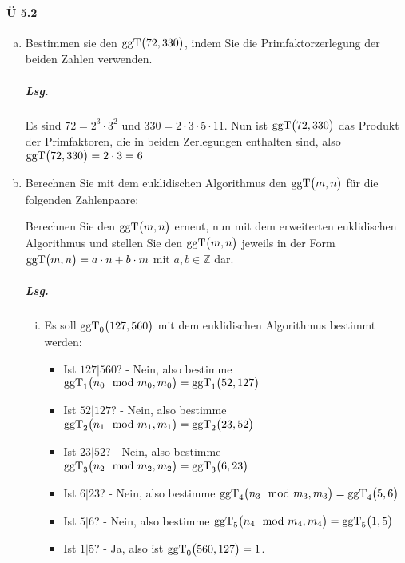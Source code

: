 \documentclass{scrreprt}
\newcommand{\ggT}[0]{\text{ggT}}
\begin{document}
\paragraph{Ü 5.2}
\begin{enumerate}[(a)]
\item Bestimmen sie den $\ggT\qty\big(72, 330)$, indem Sie die
  Primfaktorzerlegung der beiden Zahlen verwenden.

  \subparagraph{Lsg.} Es sind $72 = 2^3 \cdot 3^2$ und
  $330 = 2 \cdot 3 \cdot 5 \cdot 11$.
  Nun ist $\ggT\qty\big(72, 330)$ das Produkt der Primfaktoren, die in beiden
  Zerlegungen enthalten sind, also $\ggT\qty\big(72, 330) = 2 \cdot 3 = 6$

\newpage
\item Berechnen Sie mit dem euklidischen Algorithmus den $\ggT\qty\big(m, n)$
  für die folgenden Zahlenpaare:


  Berechnen Sie den $\ggT\qty\big(m, n)$ erneut, nun mit dem erweiterten
  euklidischen Algorithmus und stellen Sie den $\ggT\qty\big(m, n)$ jeweils
  in der Form $\ggT\qty\big(m, n) = a \cdot n + b \cdot m$ mit
  $a, b \in \mathbb{Z}$ dar.

  \subparagraph{Lsg.}
  \begin{enumerate}[(i)]
  \item Es soll $\ggT_0\qty\big(127, 560)$ mit dem euklidischen Algorithmus
    bestimmt werden:
    \begin{itemize}
    \item Ist $127|560$? - Nein, also bestimme
      $\ggT_1\qty\big(n_0 \mod m_0, m_0) = \ggT_1\qty\big(52, 127)$
    \item Ist $52|127$? - Nein, also bestimme
      $\ggT_2\qty\big(n_1 \mod m_1, m_1) = \ggT_2\qty\big(23, 52)$
    \item Ist $23|52$? - Nein, also bestimme
      $\ggT_3\qty\big(n_2 \mod m_2, m_2) = \ggT_3\qty\big(6, 23)$
    \item Ist $6|23$? - Nein, also bestimme
      $\ggT_4\qty\big(n_3 \mod m_3, m_3) = \ggT_4\qty\big(5, 6)$
    \item Ist $5|6$? - Nein, also bestimme
      $\ggT_5\qty\big(n_4 \mod m_4, m_4) = \ggT_5\qty\big(1, 5)$
    \item Ist $1|5$? - Ja, also ist $\ggT_0\qty\big(560, 127) = 1$.
    \end{itemize}


\end{enumerate}
\end{enumerate}
\end{document}
